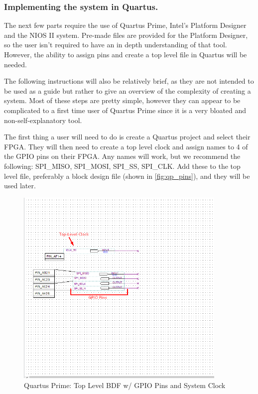 \subsubsection{Implementing the system in Quartus.}

The next few parts require the use of Quartus Prime, Intel's Platform Designer and the NIOS II system. Pre-made files are provided for the Platform Designer, so the user isn't required to have an in depth understanding of that tool. However, the ability to assign pins and create a top level file in Quartus will be needed.

The following instructions will also be relatively brief, as they are not intended to be used as a guide but rather to give an overview of the complexity of creating a system. Most of these steps are pretty simple, however they can appear to be complicated to a first time user of Quartus Prime since it is a very bloated and non-self-explanatory tool. 

The first thing a user will need to do is create a Quartus project and select their FPGA. They will then need to create a top level clock and assign names to 4 of the GPIO pins on their FPGA. Any names will work, but we recommend the following: SPI\_MISO, SPI\_MOSI, SPI\_SS, SPI\_CLK. Add these to the top level file, preferably a block design file (shown in \autoref{fig:qp_pins}), and they will be used later.

\begin{figure}[!htb]
    \centering
    \includegraphics[width=0.9\textwidth]{05_evaluation/images/just_pins.png}
    \caption{Quartus Prime: Top Level BDF w/ GPIO Pins and System Clock }
    \label{fig:qp_pins}
\end{figure}

